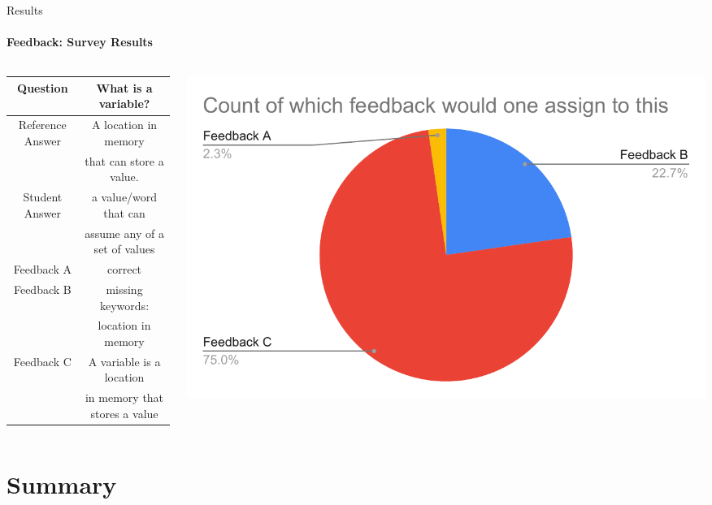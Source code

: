 \documentclass[aspectratio=169]{beamer}
\begin{document}
\begin{frame}{Results}
	\framesubtitle{Feedback: Survey Results}
	\begin{columns}
		\begin{column}{0.65\textwidth}
		\begin{table}
			\begin{tabular}{ |c|c| }
				\hline
				Question & What is a variable?  
				\\ \hline 
				Reference Answer & A location in memory\\& that can store a value.
				\\ \hline
				Student Answer & a value/word that can\\& assume any of a set of values
				\\ \hline
				Feedback A & correct
				\\ \hline
				Feedback B & missing keywords:\\& location in memory
				\\ \hline
				Feedback C & A variable is a location\\& in memory that stores a value
				\\ \hline
			\end{tabular}
		\end{table}
	\end{column}
	\begin{column}{0.5\textwidth}
		\begin{center}
			\includegraphics[width=1\textwidth]{images/survey_1.pdf}
		\end{center}
	\end{column}
	\end{columns}
\end{frame}
\section{Summary}
\end{document}
